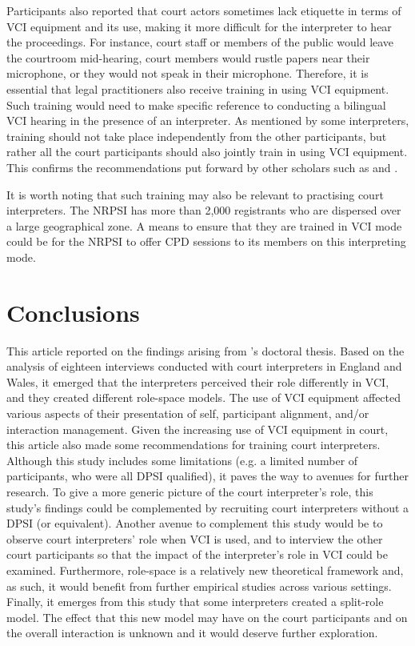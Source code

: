 \documentclass[output=paper]{langsci/langscibook}
\begin{document}
Participants also reported that court actors sometimes lack etiquette in terms of \textsc{VCI} equipment and its use, making it more difficult for the interpreter to hear the proceedings. For instance, court staff or members of the public would leave the courtroom mid-hearing, court members would rustle papers near their microphone, or they would not speak in their microphone. Therefore, it is essential that legal practitioners also receive training in using \textsc{VCI} equipment. Such training would need to make specific reference to conducting a bilingual \textsc{VCI} hearing in the presence of an interpreter. As mentioned by some interpreters, training should not take place independently from the other participants, but rather all the court participants should also jointly train in using \textsc{VCI} equipment. This confirms the recommendations put forward by other scholars such as \citet{Braun2011a} and \citet{Fowler2012}. 

It is worth noting that such training may also be relevant to practising court interpreters. The \textsc{NRPSI} has more than 2,000 registrants who are dispersed over a large geographical zone. A means to ensure that they are trained in \textsc{VCI} mode could be for the \textsc{NRPSI} to offer \textsc{CPD} sessions to its members on this interpreting mode. 

\section{Conclusions}
\label{sec:devaux:7}
This article reported on the findings arising from \citet{Devaux2017b}’s doctoral thesis. Based on the analysis of eighteen interviews conducted with court interpreters in England and Wales, it emerged that the interpreters perceived their role differently in \textsc{VCI}, and they created different role-space models. The use of \textsc{VCI} equipment affected various aspects of their presentation of self, participant alignment, and/or interaction management. Given the increasing use of \textsc{VCI} equipment in court, this article also made some recommendations for training court interpreters. Although this study includes some limitations (e.g. a limited number of participants, who were all \textsc{DPSI} qualified), it paves the way to avenues for further research. To give a more generic picture of the court interpreter’s role, this study’s findings could be complemented by recruiting court interpreters without a \textsc{DPSI} (or equivalent). Another avenue to complement this study would be to observe court interpreters’ role when \textsc{VCI} is used, and to interview the other court participants so that the impact of the interpreter’s role in \textsc{VCI} could be examined. Furthermore, role-space is a relatively new theoretical framework and, as such, it would benefit from further empirical studies across various settings. Finally, it emerges from this study that some interpreters created a split-role model. The effect that this new model may have on the court participants and on the overall interaction is unknown and it would deserve further exploration. 

{\sloppy\printbibliography[heading=subbibliography,notkeyword=this]} 
\end{document}
